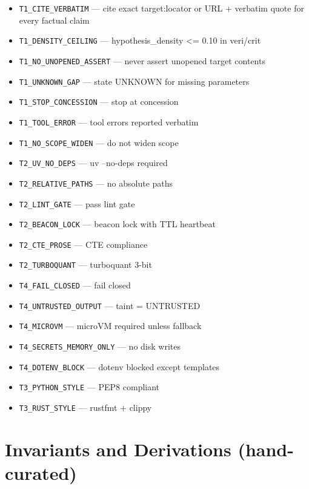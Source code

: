 \documentclass[11pt]{article}
\begin{document}
\begin{itemize}
  \item \texttt{T1\_CITE\_VERBATIM} --- cite exact target:locator or URL + verbatim quote for every factual claim %
  \item \texttt{T1\_DENSITY\_CEILING} --- hypothesis\_density <= 0.10 in veri/crit %
  \item \texttt{T1\_NO\_UNOPENED\_ASSERT} --- never assert unopened target contents %
  \item \texttt{T1\_UNKNOWN\_GAP} --- state UNKNOWN for missing parameters %
  \item \texttt{T1\_STOP\_CONCESSION} --- stop at concession %
  \item \texttt{T1\_TOOL\_ERROR} --- tool errors reported verbatim %
  \item \texttt{T1\_NO\_SCOPE\_WIDEN} --- do not widen scope %
  \item \texttt{T2\_UV\_NO\_DEPS} --- uv --no-deps required %
  \item \texttt{T2\_RELATIVE\_PATHS} --- no absolute paths %
  \item \texttt{T2\_LINT\_GATE} --- pass lint gate %
  \item \texttt{T2\_BEACON\_LOCK} --- beacon lock with TTL heartbeat %
  \item \texttt{T2\_CTE\_PROSE} --- CTE compliance %
  \item \texttt{T2\_TURBOQUANT} --- turboquant 3-bit %
  \item \texttt{T4\_FAIL\_CLOSED} --- fail closed %
  \item \texttt{T4\_UNTRUSTED\_OUTPUT} --- taint = UNTRUSTED %
  \item \texttt{T4\_MICROVM} --- microVM required unless fallback %
  \item \texttt{T4\_SECRETS\_MEMORY\_ONLY} --- no disk writes %
  \item \texttt{T4\_DOTENV\_BLOCK} --- dotenv blocked except templates %
  \item \texttt{T3\_PYTHON\_STYLE} --- PEP8 compliant %
  \item \texttt{T3\_RUST\_STYLE} --- rustfmt + clippy %
\end{itemize}

\section{Invariants and Derivations (hand-curated)}
\end{document}
